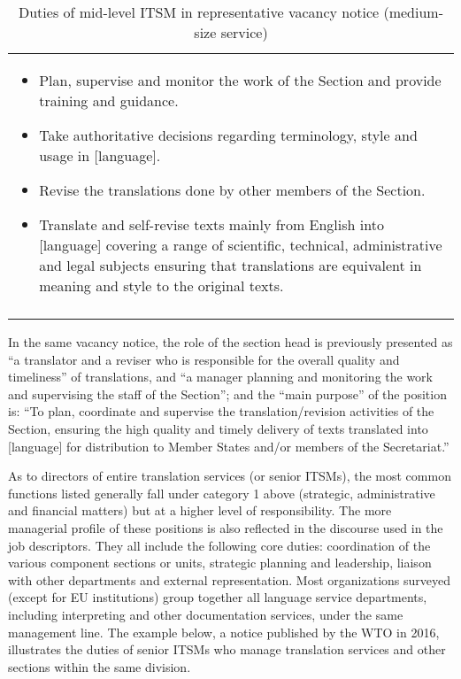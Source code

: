 \documentclass[output=paper]{langsci/langscibook}
\begin{document}
\begin{table}
\footnotesize
\begin{tabularx}{\textwidth}{Q}
 \lsptoprule
 \parbox{.9\textwidth}{

\begin{itemize} 
  \item 
  Plan, supervise and monitor the work of the Section and provide training and guidance.
  \item 
  Take authoritative decisions regarding terminology, style and usage in [language].
  \item 
  Revise the translations done by other members of the Section.
  \item 
  Translate and self-revise texts mainly from English into [language] covering a range of scientific, technical, administrative and legal subjects ensuring that translations are equivalent in meaning and style to the original texts.
  \end{itemize} 
 }\\
 \lspbottomrule
\end{tabularx}
\caption{Duties of mid-level ITSM in representative vacancy notice (medium-size service)}
\label{tab:prieto:2}
\end{table}


In the same vacancy notice, the role of the section head is previously presented as “a translator and a reviser who is responsible for the overall quality and timeliness” of translations, and “a manager planning and monitoring the work and supervising the staff of the Section”; and the “main purpose” of the position is: “To plan, coordinate and supervise the translation/revision activities of the Section, ensuring the high quality and timely delivery of texts translated into [language] for distribution to Member States and/or members of the Secretariat.”



As to directors of entire translation services (or senior ITSMs), the most common functions listed generally fall under category 1 above (strategic, administrative and financial matters) but at a higher level of responsibility. The more managerial profile of these positions is also reflected in the discourse used in the job descriptors. They all include the following core duties: coordination of the various component sections or units, strategic planning and leadership, liaison with other departments and external representation. Most organizations surveyed (except for EU institutions) group together all language service departments, including interpreting and other documentation services, under the same management line. The example below, a notice published by the WTO in 2016, illustrates the duties of senior ITSMs who manage translation services and other sections within the same division. 
\end{document}
